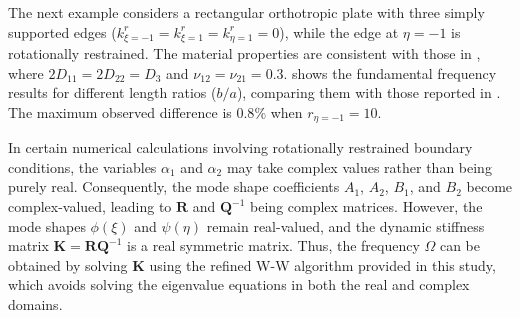 \documentclass[preprint,12pt]{elsarticle}
\begin{document}
The next example considers a rectangular orthotropic plate with three simply supported edges ($k^r_{\xi=-1} = k^r_{\xi=1} = k^r_{\eta=1} = 0$), while the edge at $\eta = -1$ is rotationally restrained. 
The material properties are consistent with those in \citealp{zhang2019new}, where $2D_{11} = 2D_{22} = D_3$ and $\nu_{12} = \nu_{21} = 0.3$.  
 shows the fundamental frequency results for different length ratios ($b/a$), comparing them with those reported in \citealp{zhang2019new}. 
The maximum observed difference is $0.8\%$ when $r_{\eta=-1} = 10$. 

In certain numerical calculations involving rotationally restrained boundary conditions, the variables $\alpha_1$ and $\alpha_2$ may take complex values rather than being purely real.  
Consequently, the mode shape coefficients $A_1$, $A_2$, $B_1$, and $B_2$ become complex-valued, leading to $\mathbf{R}$ and $\mathbf{Q}^{-1}$ being complex matrices.  
However, the mode shapes $\phi(\xi)$ and $\psi(\eta)$ remain real-valued, and the dynamic stiffness matrix $\mathbf{K} = \mathbf{R}\mathbf{Q}^{-1}$ is a real symmetric matrix.
Thus, the frequency $\Omega$ can be obtained by solving $\mathbf{K}$ using the refined W-W algorithm provided in this study, which avoids solving the eigenvalue equations in both the real and complex domains.
\end{document}

